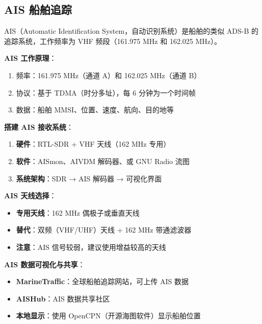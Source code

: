 \documentclass[12pt,UTF8]{ctexbook}
\begin{document}
\subsection{AIS 船舶追踪}
\label{subsec:ais}

AIS（Automatic Identification System，自动识别系统）是船舶的类似 ADS-B 的追踪系统，工作频率为 VHF 频段（161.975 MHz 和 162.025 MHz）。

\textbf{AIS 工作原理}：
\begin{enumerate}[leftmargin=2cm]
    \item 频率：161.975 MHz（通道 A）和 162.025 MHz（通道 B）
    \item 协议：基于 TDMA（时分多址），每 6 分钟为一个时间帧
    \item 数据：船舶 MMSI、位置、速度、航向、目的地等
\end{enumerate}

\textbf{搭建 AIS 接收系统}：
\begin{enumerate}[leftmargin=2cm]
    \item \textbf{硬件}：RTL-SDR + VHF 天线（162 MHz 专用）
    \item \textbf{软件}：AISmon、AIVDM 解码器、或 GNU Radio 流图
    \item \textbf{系统架构}：SDR → AIS 解码器 → 可视化界面
\end{enumerate}

\textbf{AIS 天线选择}：
\begin{itemize}[leftmargin=2cm]
    \item \textbf{专用天线}：162 MHz 偶极子或垂直天线
    \item \textbf{替代}：双频（VHF/UHF）天线 + 162 MHz 带通滤波器
    \item \textbf{注意}：AIS 信号较弱，建议使用增益较高的天线
\end{itemize}

\textbf{AIS 数据可视化与共享}：
\begin{itemize}[leftmargin=2cm]
    \item \textbf{MarineTraffic}：全球船舶追踪网站，可上传 AIS 数据
    \item \textbf{AISHub}：AIS 数据共享社区
    \item \textbf{本地显示}：使用 OpenCPN（开源海图软件）显示船舶位置
\end{itemize}
\end{document}
